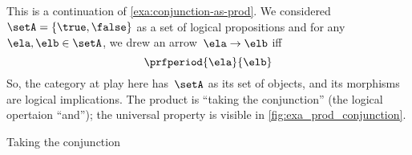 \begin{example}
    \label{exa:conjunction-as-prod-cont}
    This is a continuation of \cref{exa:conjunction-as-prod}.
    We considered~$\setA = \{ \true, \false \}$ as a set of logical propositions and for any~$\ela, \elb  \in \setA$, we drew an arrow~$\ela \to \elb$ iff
    \begin{equation*}
        \prfperiod{\ela}{\elb}
    \end{equation*}
    So, the category at play here has~$\setA$ as its set of objects, and its morphisms are logical implications.
    The product is ``taking the conjunction'' (the logical opertaion ``and''); the universal property is visible in \cref{fig:exa_prod_conjunction}.
    \begin{marginfigure}
        \centering
        \caption{Taking the conjunction}
        \label{fig:exa_prod_conjunction_cont}
    \end{marginfigure}
\end{example}


